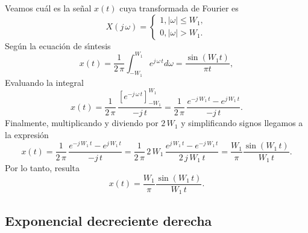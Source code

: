 Veamos cu\'{a}l es la se\~{n}al $x\left( t\right) $ cuya transformada de Fourier es 
\begin{equation}
        X\left( j \, \omega \right) =
                \left\{ \begin{array}{l}
                        1, \left| \omega \right| \leq W_{1}, \\ 
                        0, \left| \omega \right| >W_{1}.
                \end{array} \right.
\end{equation}
Seg\'{u}n la ecuaci\'{o}n de s\'{\i}ntesis 
\begin{equation}
        x\left( t\right) =
                \frac{1}{2 \, \pi}\int_{-W_{1}}^{W_{1}} e^{j \, \omega \, t}d\omega =
                        \frac{\sin \left( W_{1}t\right) }{\pi t},
\end{equation}
Evaluando la integral
\begin{equation}
	x\left( t \right) =
	\frac{1}{2 \, \pi} \, \frac{\left[e^{-j \, \omega \, t}\right]_{-W_{1}}^{W_{1}}}{-j \, t} =
	\frac{1}{2 \, \pi} \, \frac{e^{-j \,  W_{1} \, t}-e^{j \, W_{1} \, t}}{-j \, t}.
\end{equation}
Finalmente, multiplicando y diviendo por $2 \, W_{1}$ y simplificando signos llegamos a la expresión
\begin{equation}
	x\left( t \right) =
	\frac{1}{2 \, \pi} \, \frac{e^{-j \,  W_{1} \, t}-e^{j \, W_{1} \, t}}{-j \, t} =
\frac{1}{2 \, \pi} \, 2 \, W_{1} \, \frac{e^{j \,  W_{1} \, t}-e^{-j \, W_{1} \, t}}{2 \, j \, W_{1} \, t} =	
	\frac{W_{1}}{\pi} \frac{\sin\left( W_{1} \, t\right) }{W_{1} \, t}.
\end{equation}
Por lo tanto, resulta 
\begin{equation}
        x\left( t\right) =	\frac{W_{1}}{\pi} \frac{\sin\left( W_{1} \, t\right) }{W_{1} \, t}.
\end{equation}

\subsection{Exponencial decreciente derecha}

